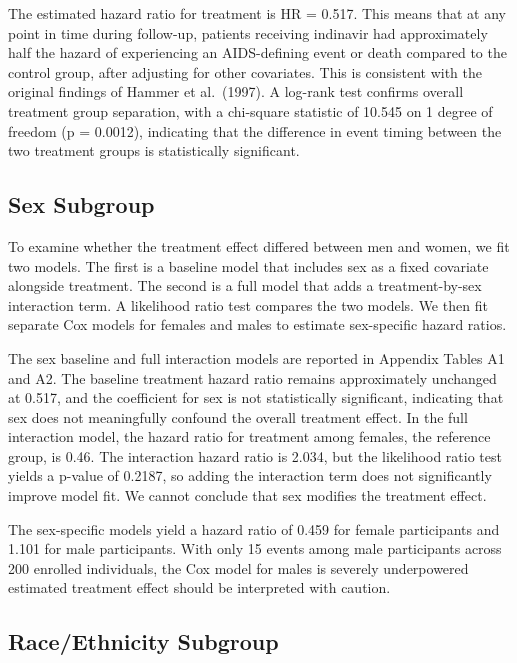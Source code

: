 \documentclass[
  letterpaper,
  DIV=11,
  numbers=noendperiod]{scrartcl}
\begin{document}
The estimated hazard ratio for treatment is HR = 0.517. This means that
at any point in time during follow-up, patients receiving indinavir had
approximately half the hazard of experiencing an AIDS-defining event or
death compared to the control group, after adjusting for other
covariates. This is consistent with the original findings of Hammer et
al.~(1997). A log-rank test confirms overall treatment group separation,
with a chi-square statistic of 10.545 on 1 degree of freedom (p =
0.0012), indicating that the difference in event timing between the two
treatment groups is statistically significant.

\subsection{Sex Subgroup}\label{sex-subgroup}

To examine whether the treatment effect differed between men and women,
we fit two models. The first is a baseline model that includes sex as a
fixed covariate alongside treatment. The second is a full model that
adds a treatment-by-sex interaction term. A likelihood ratio test
compares the two models. We then fit separate Cox models for females and
males to estimate sex-specific hazard ratios.

The sex baseline and full interaction models are reported in Appendix
Tables A1 and A2. The baseline treatment hazard ratio remains
approximately unchanged at 0.517, and the coefficient for sex is not
statistically significant, indicating that sex does not meaningfully
confound the overall treatment effect. In the full interaction model,
the hazard ratio for treatment among females, the reference group, is
0.46. The interaction hazard ratio is 2.034, but the likelihood ratio
test yields a p-value of 0.2187, so adding the interaction term does not
significantly improve model fit. We cannot conclude that sex modifies
the treatment effect.

The sex-specific models yield a hazard ratio of 0.459 for female
participants and 1.101 for male participants. With only 15 events among
male participants across 200 enrolled individuals, the Cox model for
males is severely underpowered estimated treatment effect should be
interpreted with caution.

\subsection{Race/Ethnicity Subgroup}\label{raceethnicity-subgroup}
\end{document}
